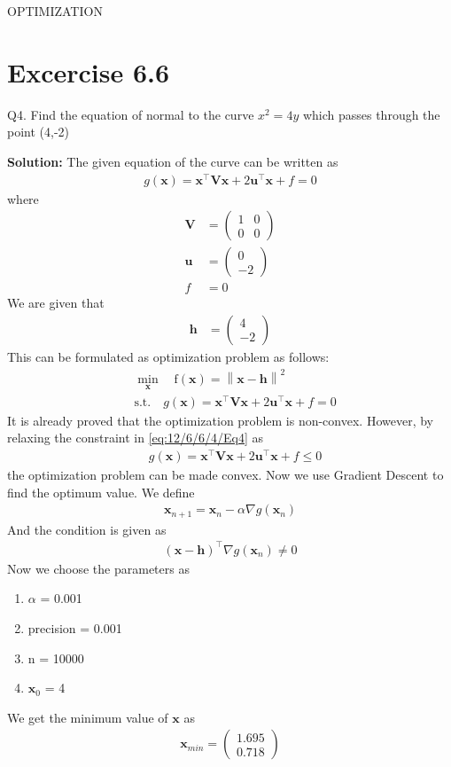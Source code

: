 \documentclass[12pt]{article}
\providecommand{\brak}[1]{\ensuremath{\left(#1\right)}}
\providecommand{\norm}[1]{\left\lVert#1\right\rVert}
\newcommand{\solution}{\noindent \textbf{Solution: }}
\newcommand{\myvec}[1]{\ensuremath{\begin{pmatrix}#1\end{pmatrix}}}
\let\vec\mathbf
\begin{document}
\begin{center}
\textbf\large{OPTIMIZATION}

\end{center}
\section*{Excercise 6.6}

Q4. Find the equation of normal to the curve $x^2=4y$ which passes through the point (4,-2)

\solution
The given equation of the curve can be written as  
\begin{align}
	\label{eq:12/6/6/4/parabolaEq2}
	g\brak{\vec{x}} = \vec{x}^\top\vec{V}\vec{x} + 2\vec{u}^\top\vec{x} + f = 0 
\end{align}
where
\begin{align}
	\vec{V} &= \myvec{ 1 & 0 \\ 0 & 0} \\
	\vec{u} &= \myvec{0 \\ -2} \\
	f &= 0 
\end{align}
We are given that 
\begin{align}
	\vec{h} &= \myvec{4 \\ -2}
\end{align}
This can be formulated as optimization problem as follows:
\begin{align}
	\label{eq:12/6/6/4/Eq3}
	&  \min_{\vec{x}} \quad \text{f}\brak{\vec{x}} = \norm{\vec{x}-\vec{h}}^2\\
	\label{eq:12/6/6/4/Eq4}
	& \text{s.t.}\quad g\brak{\vec{x}} = \vec{x}^\top\vec{V}\vec{x} + 2\vec{u}^\top\vec{x} + f = 0  
\end{align}
It is already proved that the optimization problem is non-convex. However, by relaxing the constraint in \eqref{eq:12/6/6/4/Eq4} as
\begin{align}
	\label{eq:12/6/6/4/Eq7}
	& g\brak{\vec{x}} = \vec{x}^\top\vec{V}\vec{x} + 2\vec{u}^\top\vec{x} + f \le 0  
\end{align}
the optimization problem can be made convex.
\fi
Now we use Gradient Descent to find the optimum value. We define
\begin{align}
	\vec{x}_{n+1} = \vec{x}_n - \alpha\nabla g\brak{\vec{x}_n}
\end{align}
And the condition is given as 
\begin{align}
	\brak{\vec{x}-\vec{h}}^\top\nabla g\brak{\vec{x}_n} \neq 0
\end{align}
Now we choose the parameters as
\begin{enumerate}
	\item $\alpha$ = 0.001
	\item precision = 0.001
	\item n = 10000
	\item $\vec{x}_0$ = 4
\end{enumerate}
We get the minimum value of $\vec{x}$ as
\begin{align}
	\vec{x}_{min} = \myvec{1.695\\0.718}
\end{align}
\end{document}
